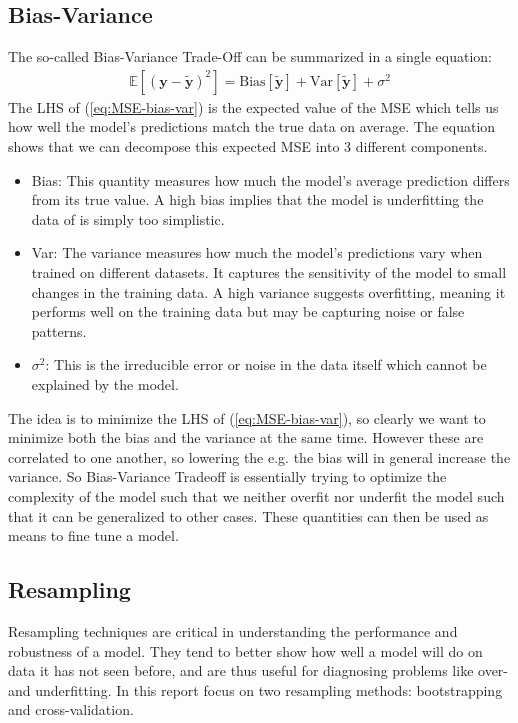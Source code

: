 \documentclass[%
reprint,
amsmath,amssymb,
aps,
pra,
]{revtex4-2}
\begin{document}
\subsection{Bias-Variance}
The so-called Bias-Variance Trade-Off can be summarized in a single equation:
\begin{align}
	\mathbb{E}[(\bm y-\tilde{\bm y})^2]=\text{Bias}[\tilde{\bm y}]+\text{Var}[\tilde{\bm y}]+\sigma^2
	\label{eq:MSE-bias-var}
\end{align}
The LHS of (\ref{eq:MSE-bias-var}) is the expected value of the MSE which tells us how well the model's predictions match the true data on average. The equation shows that we can decompose this expected MSE into 3 different components.
\begin{itemize}
	\item Bias: This quantity measures how much the model's average prediction differs from its true value. A high bias implies that the model is underfitting the data of is simply too simplistic.
	\item Var: The variance measures how much the model's predictions vary when trained on different datasets. It captures the sensitivity of the model to small changes in the training data. A high variance suggests overfitting, meaning it performs well on the training data but may be capturing noise or false patterns.
	\item $\sigma^2$: This is the irreducible error or noise in the data itself which cannot be explained by the model.
\end{itemize}
The idea is to minimize the LHS of (\ref{eq:MSE-bias-var}), so clearly we want to minimize both the bias and the variance at the same time. However these are correlated to one another, so lowering the e.g. the bias will in general increase the variance. So Bias-Variance Tradeoff is essentially trying to optimize the complexity of the model such that we neither overfit nor underfit the model such that it can be generalized to other cases. These quantities can then be used as means to fine tune a model.

\subsection{Resampling}
Resampling techniques are critical in understanding the performance and robustness of a model. They tend to better show how well a model will do on data it has not seen before, and are thus useful for diagnosing problems like over- and underfitting. In this report focus on two resampling methods: bootstrapping and cross-validation.
\end{document}
